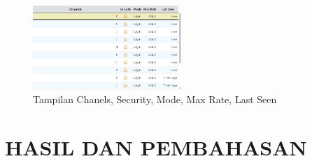\documentclass[conference]{IEEEtran}
\begin{document}
\begin{enumerate}
    \begin{figure}[h]
        \centering
        \includegraphics[width=0.5\textwidth]{7.png}
        \caption{Tampilan Chanels, Security, Mode, Max Rate, Last Seen}
    \end{figure}
    \vspace{0.2cm}
    \end{enumerate}
    
    \section{HASIL DAN PEMBAHASAN}
    \vspace{0.3cm}
    
\end{document}

